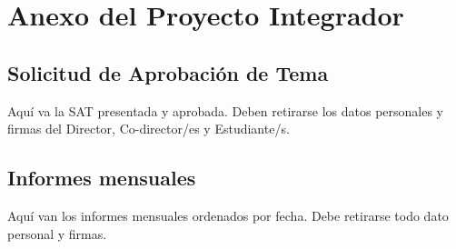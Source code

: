 \chapter{Anexo del Proyecto Integrador}
\label{anexoPI}

\section*{Solicitud de Aprobación de Tema}

Aquí va la SAT presentada y aprobada. Deben retirarse los datos personales y firmas del Director, Co-director/es y Estudiante/s.

\section*{Informes mensuales}

Aquí van los informes mensuales ordenados por fecha. Debe retirarse todo dato personal y firmas.